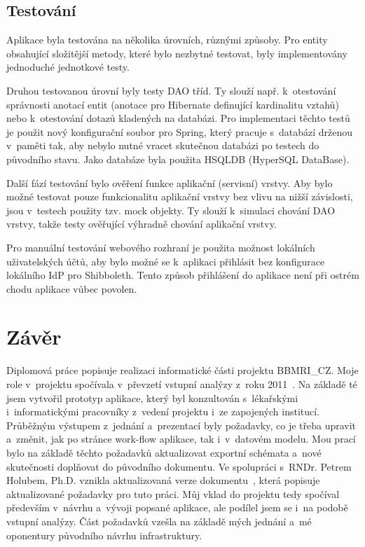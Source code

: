 \documentclass[11pt, final, oneside]{fithesis2}
\newcommand{\ProjectName}{\mbox{BBMRI\_CZ}\xspace}
\begin{document}
\section{Testování}
Aplikace byla testována na několika úrovních, různými způsoby. Pro entity obsahující složitější metody, které bylo nezbytné testovat, byly implementovány jednoduché jednotkové testy. 

Druhou testovanou úrovní byly testy DAO tříd. Ty slouží např. k~otestování správnosti anotací entit (anotace pro Hibernate definující kardinalitu vztahů) nebo k~otestování dotazů kladených na databázi. Pro implementaci těchto testů je použit nový konfigurační soubor pro Spring, který pracuje s~databází drženou v~paměti tak, aby nebylo nutné vracet skutečnou databázi po testech do původního stavu. Jako databáze byla použita HSQLDB (HyperSQL DataBase).

Další fází testování bylo ověření funkce aplikační (servisní) vrstvy. Aby bylo možné testovat pouze funkcionalitu aplikační vrstvy bez vlivu na nižší závislosti, jsou v~testech použity tzv. mock objekty. Ty slouží k~simulaci chování DAO vrstvy, takže testy ověřující výhradně chování aplikační vrstvy.

Pro manuální testování webového rozhraní je použita možnost lokálních uživatelských účtů, aby bylo možné se k~aplikaci přihlásit bez konfigurace lokálního IdP pro Shibboleth. Tento způsob přihlášení do aplikace není při ostrém chodu aplikace vůbec povolen.


\chapter{Závěr}
Diplomová práce popisuje realizaci informatické části projektu \ProjectName. Moje role v~projektu spočívala v~převzetí vstupní analýzy z~roku 2011~\cite{ARCH_2011_12_29}. Na základě té jsem vytvořil prototyp aplikace, který byl konzultován s~lékařskými i~informatickými pracovníky z~vedení projektu i~ze zapojených institucí. Průběžným výstupem z~jednání a~prezentací byly požadavky, co je třeba upravit a~změnit, jak po stránce work-flow aplikace, tak i~v~datovém modelu. Mou prací bylo na základě těchto požadavků aktualizovat exportní schémata a~nové skutečnosti doplňovat do původního dokumentu. Ve spolupráci s~RNDr. Petrem Holubem, Ph.D. vznikla aktualizovaná verze dokumentu~\cite{ARCH_2014_1_25}, která popisuje aktualizované požadavky pro tuto práci. Můj vklad do projektu tedy spočíval především v~návrhu a~vývoji popsané aplikace, ale podílel jsem se i~na podobě vstupní analýzy. Část požadavků vzešla na základě mých jednání a~mé oponentury původního návrhu infrastruktury.
\end{document}
